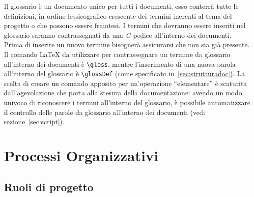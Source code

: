 \documentclass{scalatekids-article}
\begin{document}
Il glossario è un documento unico per tutti i documenti, esso conterrà tutte le
definizioni, in ordine lessicografico crescente dei termini inerenti al tema
del progetto o che possono essere fraintesi. I termini che dovranno essere
inseriti nel glossario saranno contrassegnati da una \textit{G} pedice
all'interno dei documenti. Prima di inserire un nuovo termine bisognerà
assicurarsi che non sia già presente.\\ Il comando \LaTeX\xspace da utilizzare
per contrassegnare un termine da glossario all'interno dei documenti è
\verb=\gloss=, mentre l'inserimento di una nuova parola all'interno del
glossario è \verb=\glossDef= (come specificato in~\ref{sec:strutturadoc}). La
scelta di creare un comando apposito per un'operazione ``elementare'' è
scaturita dall'agevolazione che porta alla stesura della documentazione: avendo
un modo univoco di riconoscere i termini all'interno del glossario, è possibile
automatizzare il controllo delle parole da glossario all'interno dei
documenti (vedi sezione~\ref{sec:script}).

\section{Processi Organizzativi}

\subsection{Ruoli di progetto}
\end{document}
